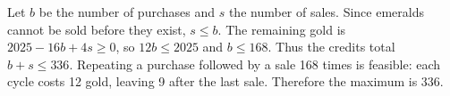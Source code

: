 Let $b$ be the number of purchases and $s$ the number of sales. Since emeralds cannot be sold before they exist, $s\le b$. The remaining gold is $2025-16b+4s\ge0$, so $12b\le2025$ and $b\le168$. Thus the credits total $b+s\le336$. Repeating a purchase followed by a sale 168 times is feasible: each cycle costs 12 gold, leaving 9 after the last sale. Therefore the maximum is $\boxed{336}$.

